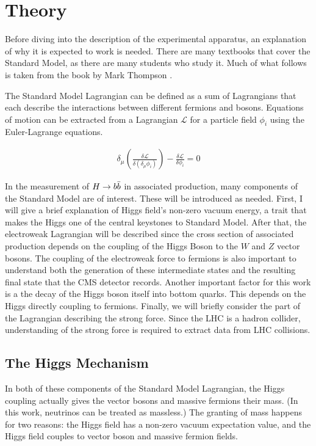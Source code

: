 \chapter{Theory} \label{ch:theory}

Before diving into the description of the experimental apparatus,
an explanation of why it is expected to work is needed.
There are many textbooks that cover the Standard Model, as there are many students who study it.
Much of what follows is taken from the book by Mark Thompson \cite{Thomson:1529540}.

The Standard Model Lagrangian can be defined as a sum of Lagrangians that each describe
the interactions between different fermions and bosons.
Equations of motion can be extracted from a Lagrangian $\mathcal{L}$
for a particle field $\phi_i$ using the Euler-Lagrange equations.

\begin{gather}
  \delta_\mu\left(\frac{\delta \mathcal{L}}{\delta(\delta_\mu \phi_i)}\right) -
  \frac{\delta \mathcal{L}}{\delta \phi_i} = 0
\end{gather}

In the measurement of $H\rightarrow b\bar{b}$ in associated production,
many components of the Standard Model are of interest.
These will be introduced as needed.
First, I will give a brief explanation of Higgs field's non-zero vacuum energy,
a trait that makes the Higgs one of the central keystones to Standard Model.
After that, the electroweak Lagrangian will be described since
the cross section of associated production depends on
the coupling of the Higgs Boson to the $W$ and $Z$ vector bosons.
The coupling of the electroweak force to fermions is also important to
understand both the generation of these intermediate states and
the resulting final state that the CMS detector records.
Another important factor for this work is a the decay of the Higgs boson itself into bottom quarks.
This depends on the Higgs directly coupling to fermions.
Finally, we will briefly consider the part of the Lagrangian describing the strong force.
Since the LHC is a hadron collider,
understanding of the strong force is required to extract data from LHC collisions.

\section{The Higgs Mechanism}

In both of these components of the Standard Model Lagrangian,
the Higgs coupling actually gives the vector bosons and massive fermions their mass.
(In this work, neutrinos can be treated as massless.)
The granting of mass happens for two reasons:
the Higgs field has a non-zero vacuum expectation value,
and the Higgs field couples to vector boson and massive fermion fields.


